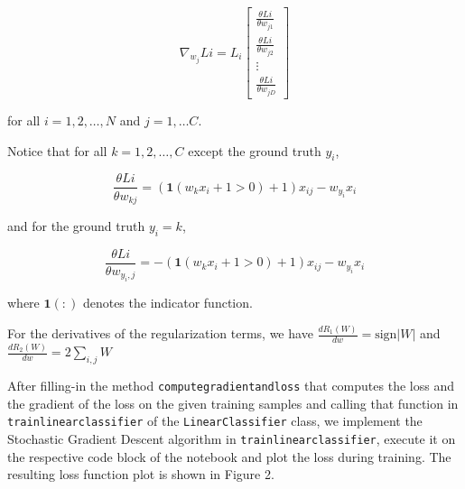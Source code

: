 \documentclass{article}
\def\code#1{\texttt{#1}}
\begin{document}
    $$ \nabla_{w_{j}}Li =  L_i \begin{bmatrix}
    	\frac{\theta Li}{\theta w_{j1}} \\[10pt]
    	\frac{\theta Li}{\theta w_{j2}} \\[10pt]
    	\vdots \\
    	\frac{\theta Li}{\theta w_{jD}}
    \end{bmatrix}
    $$
    
    for all $i= 1,2,\ldots,N$ and  $j=1,\ldots C$.
    
    Notice that for all $k=1,2,\ldots,C$ except the ground truth $y_i$, 
    
    $$\frac{\theta Li}{\theta w_{kj}} = (\mathbf{1}(w_k x_i +1 > 0) +1) x_{ij} - w_{y_i}x_i$$
    
    and for the ground truth $y_i = k$,
    
    $$\frac{\theta Li}{\theta w_{y_i, j}} = -( \mathbf{1}(w_k x_i +1 > 0) + 1) x_{ij} - w_{y_i}x_i$$
    
    where $\mathbf{1}(:)$ denotes the indicator function.
   
    For the derivatives of the regularization terms, we have $\frac{dR_1(W)}{dw} = \text{sign}|W|$ and $\frac{dR_2(W)}{dw} = 2 \sum_{i,j} W$
    
   
    
    
    
    \newpage
    

    \vspace{10em}
    
    After filling-in the method \code{compute\textunderscore gradient\textunderscore and\textunderscore loss} that computes the loss and the gradient of the loss on the given training samples and calling that function in \code{train\textunderscore linear\textunderscore classifier} of the \code{LinearClassifier} class, we implement the Stochastic Gradient Descent algorithm in \code{train\textunderscore linear\textunderscore classifier}, execute it on the respective code block of the notebook and plot the loss during training. The resulting loss function plot is shown in Figure 2. \\
    
\end{document}
